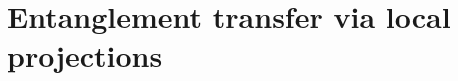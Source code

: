 \documentclass[
	aps, pra,
	superscriptaddress, twocolumn,
	floatfix,
	10pt
]{revtex4-1}
\newcommand{\parTitle}[1]{\noindent{\color{Mahogany}(\emph{#1})}}
\newcommand{\LI}[1]{\highlight{(LI: \textit{#1})}}
\renewcommand{\parTitle}[1]{}
\begin{document}


\section{Entanglement transfer via local projections}
\label{sec:entanglement_transfer_local_projections}
\end{document}
